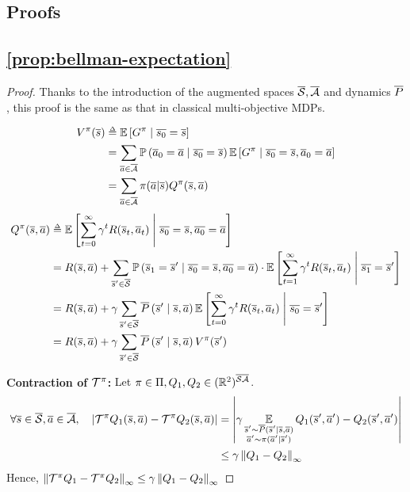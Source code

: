 \begin{subappendices}

\section{Proofs}
\label{sec:proofs}
\subsection{\autoref{prop:bellman-expectation}}

\begin{proof}
	Thanks to the introduction of the augmented spaces $\overline{\mathcal{S}}, \overline{\mathcal{A}}$ and dynamics $\overline{P}$, this proof is the same as that in classical multi-objective MDPs.
	
	\begin{align*}
	V^\pi(\os) &\eqdef \expectedvalue\left[ G^\pi \condbar \ov{s_0} = \os\right] \\
	&=\sum_{\oa\in\ocA} \probability{\oa_0 = \oa \condbar\ov{s_0} = \os} \expectedvalue\left[ G^\pi \condbar \ov{s_0} = \os, \oa_0 = \oa\right]\\
	&= \sum_{\oa\in\ocA} \pi(\oa | \os) Q^\pi(\os,\oa)
	\end{align*}
	\begin{align*}
	Q^\pi(\os, \oa) &\eqdef \expectedvalue\left[\sum_{t=0}^\infty \gamma^t R(\os_t, \oa_t)\condbar \ov{s_0} = \os, \ov{a_0} = \oa\right] \\
	&= R(\os, \oa) + \sum_{\os'\in\ocS}\probability{\os_1 = \os' \condbar\ov{s_0} = \os, \ov{a_0} = \oa}\cdot \expectedvalue\left[\sum_{t=1}^\infty \gamma^t R(\os_t, \oa_t)\condbar \ov{s_1} = \os'\right] \\
	&= R(\os, \oa) + \gamma\sum_{\os'\in\ocS}\ov{P}\left(\os' \condbar\os, \oa\right) \expectedvalue\left[\sum_{t=0}^\infty \gamma^t R(\os_t, \oa_t) \condbar \ov{s_0} = \os'\right] \\
	&=  R(\os, \oa) + \gamma\sum_{\os'\in\ocS}\ov{P}\left(\os' \condbar\os, \oa\right) V^\pi(\os')
	\end{align*}
	
	\textbf{Contraction of $\mathcal{T}^\pi$:}
	Let $\pi\in\Pi, Q_1, Q_2\in(\mathbb{R}^2)^{\overline{\mathcal{S}}\overline{\mathcal{A}}}$.
	\begin{align*}
	\forall \overline{s}\in\overline{\mathcal{S}}, \overline{a}\in\overline{\mathcal{A}},\quad \left|\mathcal{T}^\pi Q_1(\overline{s},\overline{a}) - \mathcal{T}^\pi Q_2(\overline{s},\overline{a})\right| &= \left|\gamma\operatorname*{\mathbb{E}}\limits_{\substack{\overline{s}'\sim\overline{P}(\overline{s}'|\overline{s},\overline{a}) \\ \overline{a}'\sim\pi(\overline{a}'|\overline{s}')}} Q_1(\overline{s}',\overline{a}') - Q_2(\overline{s}',\overline{a}')\right|\\
	&\leq \gamma\left\|Q_1-Q_2\right\|_\infty
	\end{align*}
	Hence, $\left\|\mathcal{T}^\pi Q_1  - \mathcal{T}^\pi Q_2 \right\|_\infty \leq \gamma\left\|Q_1-Q_2\right\|_\infty$
	

\end{proof}
\end{subappendices}
